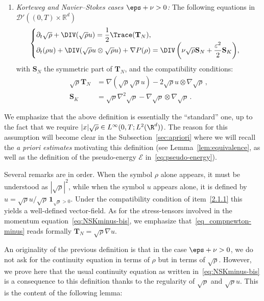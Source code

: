 \begin{defi}
\begin{enumerate}
\item \label{2.1.3} \emph{Korteweg and Navier--Stokes cases $\eps + \nu > 0$:} The following equations in $\mathcal D'((0,T)\times \mathbb R^d)$
\begin{equation}\label{eq:NSKminus-bis}
\begin{cases}
\partial_t\sqrt{\rho}+\DIV (\sqrt{\rho} u)= \dfrac{1}{2}\Trace(\mathbf T_N),\\
\partial_t ({\rho}u) +\DIV (\sqrt{\rho}u \otimes \sqrt{\rho}u) + \nabla P(\rho) =\DIV \left(\nu\sqrt \rho \mathbf S_N + \dfrac{\varepsilon^2}{2} \mathbf S_K\right)\!,
\end{cases}
\end{equation}
with $\mathbf S_N$ the symmetric part of $\mathbf T_N$, and the compatibility conditions:
\begin{align}\label{eq_compnewton-minus}
\sqrt{\rho}\mathbf T_{N} &= \nabla(\sqrt{\rho} \sqrt{\rho} u) - 2 \sqrt{\rho}u \otimes \nabla \sqrt{\rho}\,, \\
\mathbf S_K &=\sqrt{\rho}\nabla^2 \sqrt{\rho} - \nabla \sqrt{\rho} \otimes \nabla
\sqrt{\rho}\,. \label{eq_compbohm-minus}
\end{align}
\end{enumerate}
\end{defi}

We emphasize that the above definition is essentially the ``standard'' one, up to the fact that we require $|x|\sqrt\rho\in L^\infty(0,T;L^2(\R^d))$. The reason for this assumption will become clear in the Subsection~\ref{sec:apriori} where we will recall the \emph{a priori estimates} motivating this definition (see Lemma~\ref{lem:equivalence}, as well as the definition of the pseudo-energy $\mathcal E$ in~\eqref{eq:pseudo-energy}).

Several remarks are in order. When the symbol $\rho$ alone appears, it must be understood as $|\sqrt{\rho}|^2$, while when the symbol $u$ appears alone, it is defined by $u =
\sqrt{\rho}u/\sqrt{\rho}\,\mathbf 1_{\sqrt{\rho}>0}.$ Under the compatibility condition of item~\eqref{2.1.1} this yields a well-defined vector-field. As for the stress-tensors involved in the momentum equation~\eqref{eq:NSKminus-bis}, we emphasize that~\eqref{eq_compnewton-minus} reads formally $\mathbf T_N = \sqrt{\rho} \nabla u.$

An originality of the previous definition is that in the case $\eps+\nu>0$, we do not ask for the continuity equation in terms of $\rho$ but in terms of $\sqrt{\rho}.$ However, we prove here that the usual continuity equation as written in~\eqref{eq:NSKminus-bis} is a consequence to this definition thanks to the regularity of $\sqrt{\rho}$ and $\sqrt{\rho}u.$ This is the content of the following lemma:

